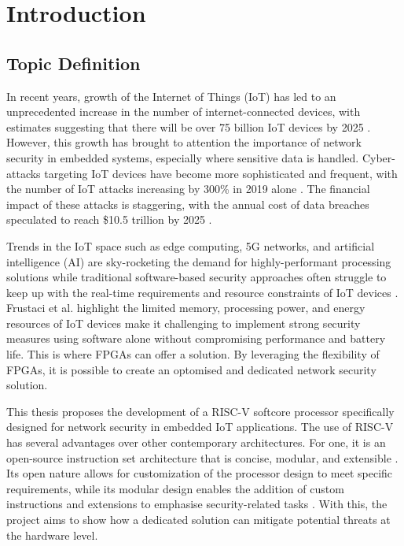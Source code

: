 \chapter[Introduction]{Introduction}
\label{Chap:Introduction}

\section{Topic Definition}
In recent years, growth of the Internet of Things (IoT) has led to an unprecedented increase in the number of internet-connected devices, with estimates suggesting that there will be over 75 billion IoT devices by 2025 \cite{Alam2018}. However, this growth has brought to attention the importance of network security in embedded systems, especially where sensitive data is handled. Cyber-attacks targeting IoT devices have become more sophisticated and frequent, with the number of IoT attacks increasing by 300\% in 2019 alone \cite{Michael2019}. The financial impact of these attacks is staggering, with the annual cost of data breaches speculated to reach \$10.5 trillion by 2025 \cite{Morgan2020}. 

Trends in the IoT space such as edge computing, 5G networks, and artificial intelligence (AI) are sky-rocketing the demand for highly-performant processing solutions \cite{Nuttall2018} while traditional software-based security approaches often struggle to keep up with the real-time requirements and resource constraints of IoT devices \cite{Frustaci2018}. Frustaci et al. \cite{Frustaci2018} highlight the limited memory, processing power, and energy resources of IoT devices make it challenging to implement strong security measures using software alone without compromising performance and battery life. This is where FPGAs can offer a solution. By leveraging the flexibility of FPGAs, it is possible to create an optomised and dedicated network security solution.

This thesis proposes the development of a RISC-V softcore processor specifically designed for network security in embedded IoT applications. The use of RISC-V has several advantages over other contemporary architectures. For one, it is an open-source instruction set architecture that is concise, modular, and extensible \cite{Patterson2017}. Its open nature allows for customization of the processor design to meet specific requirements, while its modular design enables the addition of custom instructions and extensions to emphasise security-related tasks \cite{Waterman2016}. With this, the project aims to show how a dedicated solution can mitigate potential threats at the hardware level.
\clearpage

